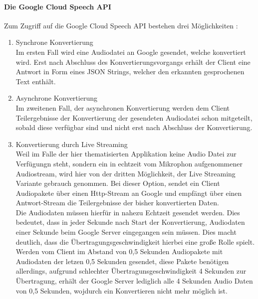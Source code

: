 \paragraph{Die Google Cloud Speech API}
Zum Zugriff auf die Google Cloud Speech API bestehen drei Möglichkeiten \cite{API Doc}:
\begin{enumerate}
	\item Synchrone Konvertierung\\
	Im ersten Fall wird eine Audiodatei an Google gesendet, welche konvertiert wird. Erst nach Abschluss des Konvertierungsvorgangs erhält der Client eine Antwort in Form eines JSON Strings, welcher den erkannten gesprochenen Text enthält.
	\item Asynchrone Konvertierung\\
	Im zweitenen Fall, der asynchronen Konvertierung werden dem Client Teilergebnisse der Konvertierung der gesendeten Audiodatei schon mitgeteilt, sobald diese verfügbar sind und nicht erst nach Abschluss der Konvertierung.
	\item Konvertierung durch Live Streaming\\
	Weil im Falle der hier thematisierten Applikation keine Audio Datei zur Verfügungn steht, sondern ein in echtzeit vom Mikrophon aufgenommener Audiostream, wird hier von der dritten Möglichkeit, der Live Streaming Variante gebrauch genommen. Bei dieser Option, sendet ein Client Audiopakete über einen Http-Stream an Google und empfängt über einen Antwort-Stream die Teilergebnisse der bisher konvertierten Daten.\\
	Die Audiodaten müssen hierfür in nahezu Echtzeit gesendet werden. Dies bedeutet, dass in jeder Sekunde nach Start der Konvertierung, Audiodaten einer Sekunde beim Google Server eingegangen sein müssen. Dies macht deutlich, dass die Übertragungsgeschwindigkeit hierbei eine große Rolle spielt. Werden vom Client im Abstand von 0,5 Sekunden Audiopakete mit Audiodaten der letzen 0,5 Sekunden gesendet, diese Pakete benötigen allerdings, aufgrund schlechter Übertragunsgeschwindigkeit 4 Sekunden zur Übertragung, erhält der Google Server lediglich alle 4 Sekunden Audio Daten von 0,5 Sekunden, wojdurch ein Konvertieren nicht mehr möglich ist.
\end{enumerate}
